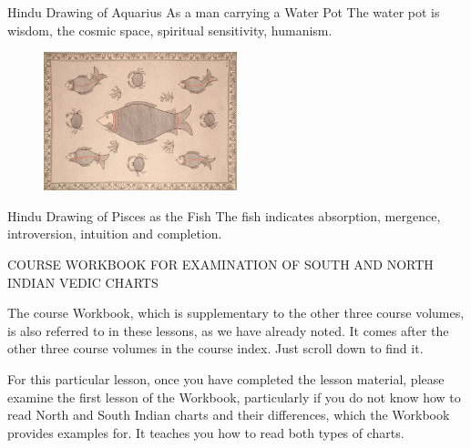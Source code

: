 Hindu Drawing of Aquarius
As a man carrying a Water Pot
The water pot is wisdom, the cosmic space, spiritual sensitivity, humanism.

 


\begin{figure}[H]
 \centering
\includegraphics[width=0.5\textwidth]{pics/Pisces.png}
 \end{figure}
 

Hindu Drawing of Pisces as the Fish
The fish indicates absorption, mergence, introversion, intuition and completion.



 

COURSE WORKBOOK FOR EXAMINATION OF SOUTH AND NORTH INDIAN VEDIC CHARTS

The course Workbook, which is supplementary to the other three course volumes, is also referred to in these lessons, as we have already noted. It comes after the other three course volumes in the course index. Just scroll down to find it.

For this particular lesson, once you have completed the lesson material, please examine the first lesson of the Workbook, particularly if you do not know how to read North and South Indian charts and their differences, which the Workbook provides examples for. It teaches you how to read both types of charts. 